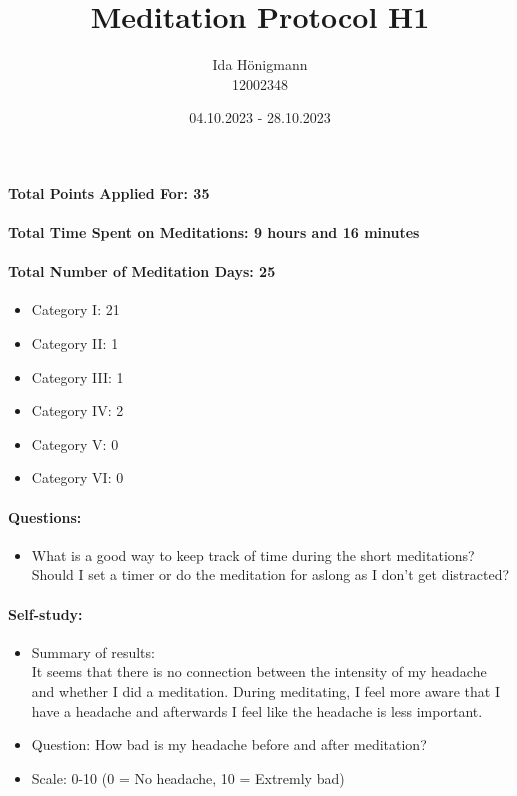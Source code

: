 \documentclass[11pt,a4paper]{article}
\begin{document}
\afterpage{\restorepagecolor}
\title{\LARGE\bfseries Meditation Protocol H1}
\author{Ida Hönigmann \\ 12002348}
\date{04.10.2023 - 28.10.2023}
\maketitle

\paragraph{Total Points Applied For: 35}
\paragraph{Total Time Spent on Meditations: 9 hours and 16 minutes}
\paragraph{Total Number of Meditation Days: 25}

\begin{itemize}
    \item Category I: 21
    \item Category II: 1
    \item Category III: 1
    \item Category IV: 2
    \item Category V: 0
    \item Category VI: 0
\end{itemize}

\paragraph{Questions:}
\begin{itemize}
    \item What is a good way to keep track of time during the short meditations? Should I set a timer or do the meditation for aslong as I don't get distracted?
\end{itemize}

\paragraph{Self-study:}
\begin{itemize}
    \item Summary of results:\\
    It seems that there is no connection between the intensity of my headache and whether I did a meditation. During meditating, I feel more aware that I have a headache and afterwards I feel like the headache is less important.
    \item Question: How bad is my headache before and after meditation?
    \item Scale: 0-10 (0 = No headache, 10 = Extremly bad)
\end{itemize}
\end{document}
